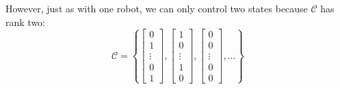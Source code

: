  However, just as with one robot, we can only control two states because $\mathcal{C}$ has rank two:
\begin{equation}
\mathcal{C}=\left\{ \begin{bmatrix} 
0\\
1\\
\vdots\\
0\\
1
\end{bmatrix}
,
  \begin{bmatrix} 
1\\
0\\
\vdots\\
1\\
0
\end{bmatrix}
,
\begin{bmatrix} 
0\\
0\\
\vdots\\
0\\
0
\end{bmatrix}, 
\ldots \right\}
\end{equation}  
